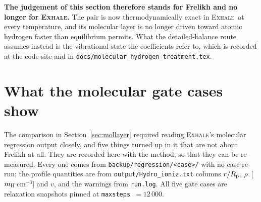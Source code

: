 \documentclass[english,a4paper]{my_memo}
\newcommand{\Rp}{R_{\rm p}}
\newcommand{\EXHALE}{\textsc{Exhale}}
\begin{document}
\textbf{The judgement of this section therefore stands for Frelikh and no
longer for \EXHALE.} The pair is now thermodynamically exact in \EXHALE\ at
every temperature, and its molecular layer is no longer driven toward atomic
hydrogen faster than equilibrium permits. What the detailed-balance route
assumes instead is the vibrational state the coefficients refer to, which is
recorded at the code site and in
\texttt{docs/molecular\_hydrogen\_treatment.tex}.

\section{What the molecular gate cases show}
\label{sec:baseflaws}

The comparison in Section~\ref{sec:mollayer} required reading \EXHALE's
molecular regression output closely, and five things turned up in it that are
not about Frelikh at all. They are recorded here with the method, so that they
can be re-measured. Every one comes from
\texttt{backup/regression/\textless case\textgreater/} with no case re-run;
the profile quantities are from \texttt{output/Hydro\_ioniz.txt} columns
$r/\Rp$, $\rho$~[$m_{\rm H}$\,cm$^{-3}$] and $v$, and the warnings from
\texttt{run.log}. All five gate cases are relaxation snapshots pinned at
\texttt{maxsteps}~$=12\,000$.
\end{document}
